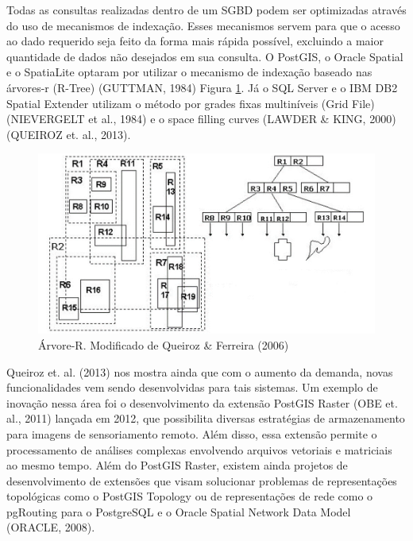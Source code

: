 		Todas as consultas realizadas dentro de um SGBD podem ser optimizadas através do uso de mecanismos de indexação. Esses mecanismos servem para que o acesso ao dado requerido seja feito da forma mais rápida possível, excluindo a maior quantidade de dados não desejados em sua consulta. O PostGIS, o Oracle Spatial e o SpatiaLite optaram por utilizar o mecanismo de indexação baseado nas árvores-r (R-Tree) (GUTTMAN, 1984) Figura \ref{fig:arvorer}. Já o SQL Server e o IBM DB2 Spatial Extender utilizam o método por grades fixas multiníveis (Grid File) (NIEVERGELT et al., 1984)\cite{NIEVERGELT_etal84} e o space filling curves (LAWDER \& KING, 2000)\cite{LAWDER_KING} (QUEIROZ et. al., 2013)\cite{QUEIROZ_etal13}.
		
		\begin{figure}
			\centering
			\includegraphics[width=1\linewidth]{data/arvore_r}
			\caption{Árvore-R. Modificado de Queiroz \& Ferreira (2006)}
			\label{fig:arvorer}
		\end{figure}
	
		Queiroz et. al. (2013)\cite{QUEIROZ_FERREIRA} nos mostra ainda que com o aumento da demanda, novas funcionalidades vem sendo desenvolvidas para tais sistemas. Um exemplo de inovação nessa área foi o desenvolvimento da extensão PostGIS Raster (OBE et. al., 2011)\cite{OBE_etal11} lançada em 2012, que possibilita diversas estratégias de armazenamento para imagens de sensoriamento remoto. Além disso, essa extensão permite o processamento de análises complexas envolvendo arquivos vetoriais e matriciais ao mesmo tempo. Além do PostGIS Raster, existem ainda projetos de desenvolvimento de extensões que visam solucionar problemas de representações topológicas como o PostGIS Topology ou de representações de rede como o pgRouting para o PostgreSQL e o Oracle Spatial Network Data Model (ORACLE, 2008)\cite{ORACLE}.
		
